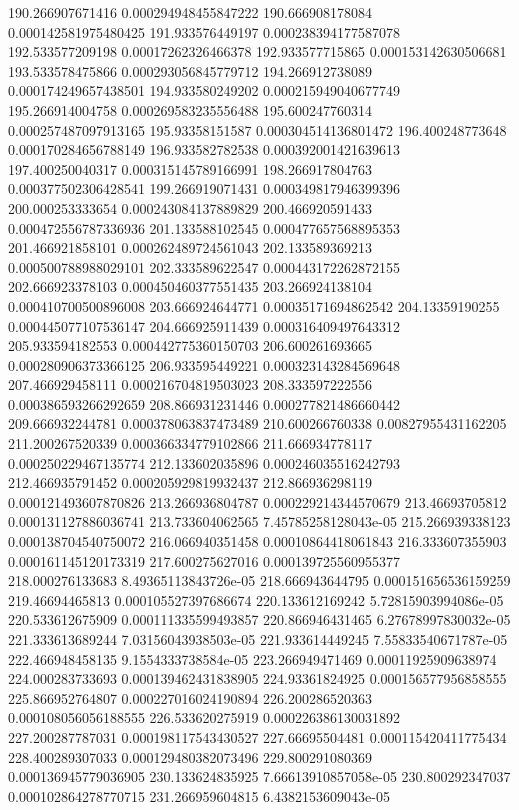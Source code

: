 {190.266907671416 0.000294948455847222
190.666908178084 0.000142581975480425
191.933576449197 0.000238394177587078
192.533577209198 0.00017262326466378
192.933577715865 0.000153142630506681
193.533578475866 0.000293056845779712
194.266912738089 0.000174249657438501
194.933580249202 0.000215949040677749
195.266914004758 0.000269583235556488
195.600247760314 0.000257487097913165
195.93358151587 0.000304514136801472
196.400248773648 0.000170284656788149
196.933582782538 0.000392001421639613
197.400250040317 0.000315145789166991
198.266917804763 0.000377502306428541
199.266919071431 0.000349817946399396
200.000253333654 0.000243084137889829
200.466920591433 0.000472556787336936
201.133588102545 0.000477657568895353
201.466921858101 0.000262489724561043
202.133589369213 0.000500788988029101
202.333589622547 0.000443172262872155
202.666923378103 0.000450460377551435
203.266924138104 0.000410700500896008
203.666924644771 0.00035171694862542
204.13359190255 0.000445077107536147
204.666925911439 0.000316409497643312
205.933594182553 0.000442775360150703
206.600261693665 0.000280906373366125
206.933595449221 0.000323143284569648
207.466929458111 0.000216704819503023
208.333597222556 0.000386593266292659
208.866931231446 0.000277821486660442
209.666932244781 0.000378063837473489
210.600266760338 0.00827955431162205
211.200267520339 0.000366334779102866
211.666934778117 0.000250229467135774
212.133602035896 0.000246035516242793
212.466935791452 0.000205929819932437
212.866936298119 0.000121493607870826
213.266936804787 0.000229214344570679
213.46693705812 0.000131127886036741
213.733604062565 7.45785258128043e-05
215.266939338123 0.000138704540750072
216.066940351458 0.00010864418061843
216.333607355903 0.000161145120173319
217.600275627016 0.000139725560955377
218.000276133683 8.49365113843726e-05
218.666943644795 0.000151656536159259
219.46694465813 0.000105527397686674
220.133612169242 5.72815903994086e-05
220.533612675909 0.000111335599493857
220.866946431465 6.27678997830032e-05
221.333613689244 7.03156043938503e-05
221.933614449245 7.55833540671787e-05
222.466948458135 9.1554333738584e-05
223.266949471469 0.00011925909638974
224.000283733693 0.000139462431838905
224.93361824925 0.000156577956858555
225.866952764807 0.000227016024190894
226.200286520363 0.000108056056188555
226.533620275919 0.000226386130031892
227.200287787031 0.000198117543430527
227.66695504481 0.000115420411775434
228.400289307033 0.000129480382073496
229.800291080369 0.000136945779036905
230.133624835925 7.66613910857058e-05
230.800292347037 0.000102864278770715
231.266959604815 6.4382153609043e-05
}
